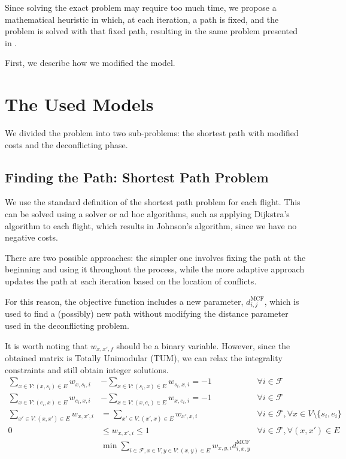 \documentclass[../thesis.tex]{subfiles}
\begin{document}
Since solving the exact problem may require too much time, we propose a mathematical heuristic in which, at each iteration, a path is fixed, and the problem is solved with that fixed path, resulting in the same problem presented in \cite{pelegrin-2023}.  

First, we describe how we modified the model.

\section{The Used Models}
We divided the problem into two sub-problems: the shortest path with modified costs and the deconflicting phase.

\subsection{Finding the Path: Shortest Path Problem}\label{sssec:spp}
We use the standard definition of the shortest path problem for each flight.  
This can be solved using a solver or ad hoc algorithms, such as applying Dijkstra's algorithm to each flight, which results in Johnson's algorithm, since we have no negative costs.  

There are two possible approaches: the simpler one involves fixing the path at the beginning and using it throughout the process, while the more adaptive approach updates the path at each iteration based on the location of conflicts.  

For this reason, the objective function includes a new parameter, $d^\text{MCF}_{i,j}$, which is used to find a (possibly) new path without modifying the distance parameter used in the deconflicting problem.  

It is worth noting that $w_{x,x',f}$ should be a binary variable. However, since the obtained matrix is Totally Unimodular (TUM), we can relax the integrality constraints and still obtain integer solutions.
\begin{align}
    \sum_{x\in V:(x,s_i)\in E} w_{x,s_{i},i} &- \sum_{x\in V:(s_i,x)\in E} w_{s_{i},x,i} = -1 & \forall i \in \mathcal{F} \\
    \sum_{x\in V:(e_i,x)\in E} w_{e_{i},x,i} &- \sum_{x\in V:(x,e_i)\in E} w_{x,e_{i},i} = -1 & \forall i \in \mathcal{F} \\
    \sum_{x'\in V:(x,x')\in E} w_{x,x',i} &= \sum_{x'\in V:(x',x)\in E} w_{x',x,i} & \forall i \in \mathcal{F}, \forall x \in V\setminus\{s_{i}, e_{i}\}\\
    0 &\leq w_{x,x',i} \leq 1 & \forall i \in \mathcal{F}, \forall (x,x') \in E \nonumber \\
    &\min \sum_{i \in \mathcal{F}, x \in V, y \in V:(x,y)\in E} w_{x,y,i} d^\text{MCF}_{i,x,y}
\end{align}
\end{document}
